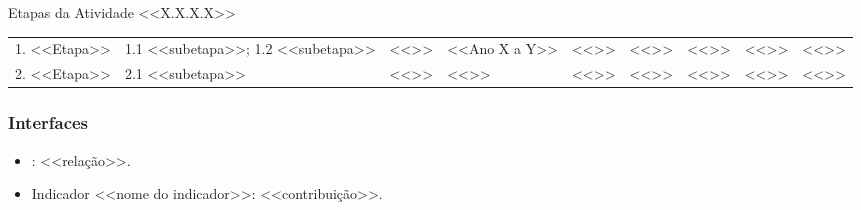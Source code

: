 \begin{landscape}
\begin{quadro}[p]
\caption{Etapas da Atividade <<X.X.X.X>>}
\label{qua:etapas-<<rotulo-curto>>}
\scriptsize
\renewcommand{\arraystretch}{1.25}
\begin{tabularx}{\linewidth}{|P{2.6cm}|L|P{2.1cm}|Q{1.3cm}|P{2.5cm}|P{2cm}|P{2.6cm}|Q{1.4cm}|P{1.7cm}|}
\hline
{} &  &  &  &
 &  &  &  &
 \\ . <<Etapa>> & 1.1 <<subetapa>>; 1.2 <<subetapa>> & <<>> & <<Ano X a Y>> &
<<>> & <<>> & <<>> & <<>> & <<>> \\ . <<Etapa>> & 2.1 <<subetapa>> & <<>> & <<>> &
<<>> & <<>> & <<>> & <<>> & <<>> \\ \hline
\end{tabularx}
\end{quadro}
\end{landscape}

\subsubsection{Interfaces}

\begin{itemize}
  \item {}: <<relação>>.
  \item Indicador <<nome do indicador>>: <<contribuição>>.
\end{itemize}
